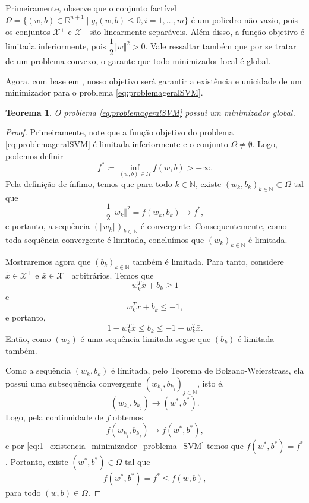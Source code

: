 \documentclass[12pt,a4paper]{scrartcl}
\def\Xset{\mathcal{X}}
\def\RR{\mathds{R}}
\def\xbar{\bar{x}}
\newtheorem{teo}{Teorema}
\theoremstyle{definition}%
\begin{document}
Primeiramente, observe que o conjunto factível $\Omega = \{ (w,b) \in \RR^{n+1} \mid g_{i}(w,b) \leq 0, i = 1, \ldots , m \}$ é um poliedro não-vazio, pois os conjuntos $\Xset^{+}$ e $\Xset^{-}$ são linearmente separáveis. Além disso, a função objetivo é limitada inferiormente, pois $\dfrac{1}{2}\Vert w \Vert^{2} >0$. Vale ressaltar também que por se tratar de um problema convexo, o  garante que todo minimizador local é global.

Agora, com base em \textcite[Teo. 2.5 e 2.7]{Evelin2017}, nosso objetivo será garantir a existência e unicidade de um minimizador para o problema \eqref{eq:problemageralSVM}.

\begin{teo} \label{teo:existencia_minimizador_problema_SVM}
O problema \eqref{eq:problemageralSVM} possui um minimizador global.
\end{teo}
\begin{proof}
Primeiramente, note que a função objetivo do problema \eqref{eq:problemageralSVM} é limitada inferiormente e o conjunto $\Omega \neq \emptyset$. Logo, podemos definir
\[
f^{*} \coloneqq \inf_{(w,b) \in \Omega} f(w,b) > -\infty .
\]
Pela definição de ínfimo, temos que para todo $k \in \mathds{N}$, existe $(w_{k},b_{k})_{k\in \mathds{N}} \subset \Omega$ tal que
\[ \label{eq:1_existencia_minimizador_problema_SVM}
\dfrac{1}{2}\Vert w_{k} \Vert^{2} = f(w_{k}, b_{k}) \rightarrow f^{*} ,
\]
e portanto, a sequência $(\Vert w_{k} \Vert )_{k\in \mathds{N}}$ é convergente. Consequentemente, como toda sequência convergente é limitada, concluímos que $(w_{k})_{k\in \mathds{N}}$ é limitada.

Mostraremos agora que $(b_{k})_{k\in \mathds{N}}$ também é limitada. Para tanto, considere $\tilde{x} \in \Xset^{+}$ e $\xbar \in \Xset^{-}$ arbitrários. Temos que 
\[
w_{k}^{T}\tilde{x} + b_{k} \geq 1
\]
e
\[
w_{k}^{T}\xbar + b_{k} \leq -1,
\]
e portanto,
\[
1-w_{k}^{T}\tilde{x} \leq b_{k} \leq -1-w_{k}^{T}\xbar .
\]
Então, como $(w_{k})$ é uma sequência limitada segue que $(b_{k})$ é limitada também. 

Como a sequência $(w_{k}, b_{k})$ é limitada, pelo Teorema de Bolzano-Weierstrass, ela possui uma subsequência convergente $(w_{k_{j}}, b_{k_{j}})_{j\in \mathds{N}}$, isto é, 
\[
(w_{k_{j}}, b_{k_{j}}) \rightarrow (w^{*}, b^{*}).
\]
Logo, pela continuidade de $f$ obtemos
\[
f(w_{k_{j}}, b_{k_{j}}) \rightarrow f(w^{*}, b^{*}),
\]
e por \eqref{eq:1_existencia_minimizador_problema_SVM} temos que $f(w^{*}, b^{*}) = f^{*}$. Portanto, existe $(w^{*}, b^{*}) \in \Omega$ tal que
\[
f(w^{*}, b^{*}) = f^{*} \leq f(w,b),
\]
para todo $(w,b) \in \Omega$.
\end{proof}
\end{document}
